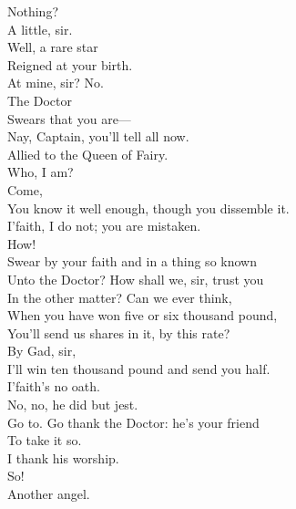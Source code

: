 \documentclass[a4paper,oneside,12pt]{memoir}
\begin{document}
\begin{drama*}
\facespeaks Nothing?\\
\dapperspeaks {} A little, sir.\\
\facespeaks {} Well, a rare star\\
Reigned at your birth.\\
\dapperspeaks {} At mine, sir? No.\\
\facespeaks {} The Doctor\\
Swears that you are---\\
\subtlespeaks {} Nay, Captain, you'll tell all now.\\
\facespeaks Allied to the Queen of Fairy.\\
\dapperspeaks {} Who, I am?\\
\facespeaks {} Come,\\
You know it well enough, though you dissemble it.\\
\dapperspeaks I'faith, I do not; you are mistaken.\\
\facespeaks {} How!\\
Swear by your faith and in a thing so known\\
Unto the Doctor? How shall we, sir, trust you\\
In the other matter? Can we ever think,\\
When you have won five or six thousand pound,\\
You'll send us shares in it, by this rate?\\
\dapperspeaks {} By Gad, sir,\\
I'll win ten thousand pound and send you half.\\
I'faith's no oath.\\
\subtlespeaks {} No, no, he did but jest.\\
\facespeaks Go to. Go thank the Doctor: he's your friend\\
To take it so.\\
\dapperspeaks {} I thank his worship.\\
\facespeaks {} So!\\
Another angel.\\

\end{drama*}
\end{document}
